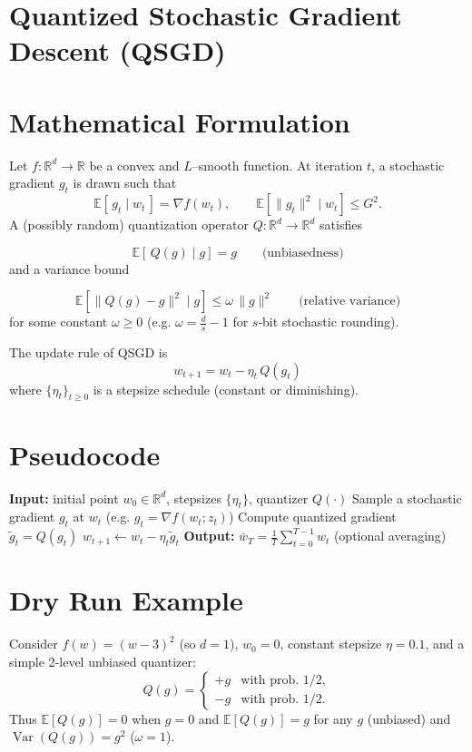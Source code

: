 \documentclass{article}
\begin{document}
\section*{Quantized Stochastic Gradient Descent (QSGD)}

\section*{Mathematical Formulation}
Let $f:\mathbb{R}^d\rightarrow\mathbb{R}$ be a convex and $L$–smooth function.  
At iteration $t$, a stochastic gradient $g_t$ is drawn such that 
\[
\mathbb{E}[\,g_t\mid w_t\,]=\nabla f(w_t),\qquad 
\mathbb{E}[\|g_t\|^2\mid w_t]\le G^2 .
\]
A (possibly random) quantization operator $Q:\mathbb{R}^d\rightarrow\mathbb{R}^d$ satisfies  

\[
\boxed{\mathbb{E}[\,Q(g)\mid g]=g}\qquad\text{(unbiasedness)} \tag{1}
\]
and a variance bound  

\[
\boxed{\mathbb{E}[\|Q(g)-g\|^2\mid g]\le \omega\,\|g\|^2}\qquad\text{(relative variance)} \tag{2}
\]
for some constant $\omega\ge0$ (e.g. $\omega =\frac{d}{s}-1$ for $s$‑bit stochastic rounding).

The update rule of QSGD is
\[
\boxed{w_{t+1}=w_t-\eta_t\,Q(g_t)}\tag{3}
\]
where $\{\eta_t\}_{t\ge0}$ is a stepsize schedule (constant or diminishing).

\section*{Pseudocode}
\begin{algorithm}[H]
\caption{Quantized Stochastic Gradient Descent}
\begin{algorithmic}[1]
\State \textbf{Input:} initial point $w_0\in\mathbb{R}^d$, stepsizes $\{\eta_t\}$, quantizer $Q(\cdot)$
    \State Sample a stochastic gradient $g_t$ at $w_t$ (e.g. $g_t=\nabla f(w_t;z_t)$)
    \State Compute quantized gradient $\tilde g_t = Q(g_t)$
    \State $w_{t+1}\gets w_t-\eta_t \tilde g_t$
\EndFor
\State \textbf{Output:} $\displaystyle \bar w_T=\frac{1}{T}\sum_{t=0}^{T-1} w_t$ (optional averaging)
\end{algorithmic}
\end{algorithm}

\section*{Dry Run Example}
Consider $f(w)=(w-3)^2$ (so $d=1$), $w_0=0$, constant stepsize $\eta=0.1$, and a simple 2‑level unbiased quantizer:
\[
Q(g)=\begin{cases}
+g & \text{with prob. }1/2,\\[2mm]
-g & \text{with prob. }1/2 .
\end{cases}
\]
Thus $\mathbb{E}[Q(g)]=0$ when $g=0$ and $\mathbb{E}[Q(g)]=g$ for any $g$ (unbiased) and $\operatorname{Var}(Q(g))=g^2$ ($\omega=1$).
\end{document}
